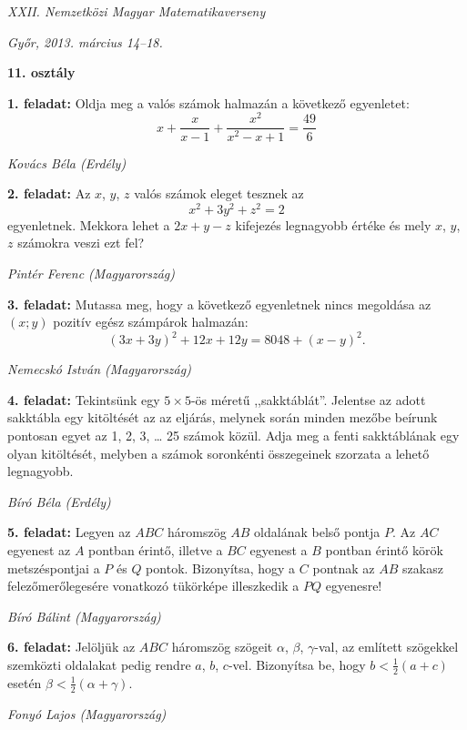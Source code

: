 \documentclass[a4paper,10pt]{article}
\newcommand{\ki}[2]{\hfill {\it #1 (#2)}\medskip}
\begin{document}
\begin{center} \Large {\em XXII. Nemzetközi Magyar Matematikaverseny} \end{center}
\begin{center} \large{\em Győr, 2013. március 14--18.} \end{center}
\smallskip
\begin{center} \large{\bf 11. osztály} \end{center}
\bigskip 

{\bf 1. feladat: } Oldja meg a valós számok halmazán a következő egyenletet:
\[x+\frac{x}{x-1}+\frac{x^2}{x^2-x+1}=\frac{49}{6}\]

\ki{Kovács Béla}{Erdély}\medskip

{\bf 2. feladat: } Az $x$, $y$, $z$ valós számok eleget tesznek az
\[x^2+3y^2+z^2=2\]
egyenletnek. Mekkora lehet a $2x+y-z$ kifejezés legnagyobb értéke és mely $x$, $y$, $z$
számokra veszi ezt fel?

\ki{Pintér Ferenc}{Magyarország}\medskip

{\bf 3. feladat: } Mutassa meg, hogy a következő egyenletnek nincs megoldása az $(x; y)$ pozitív egész számpárok halmazán:
\[(3x+3y)^2+12x+12y=8048+(x-y)^2.\]

\ki{Nemecskó István}{Magyarország}\medskip

{\bf 4. feladat: } Tekintsünk egy $5\times5$-ös méretű ,,sakktáblát''. Jelentse az adott sakktábla egy kitöltését az az eljárás, melynek során minden mezőbe beírunk pontosan egyet az 1, 2, 3, \ldots{} 25 számok közül. Adja meg a fenti sakktáblának egy olyan kitöltését, melyben a számok soronkénti összegeinek szorzata a lehető legnagyobb.

\ki{Bíró Béla}{Erdély}\medskip

{\bf 5. feladat: } Legyen az $ABC$ háromszög $AB$ oldalának belső pontja $P$. Az $AC$ egyenest az $A$ pontban érintő, illetve a $BC$ egyenest a $B$ pontban érintő körök metszéspontjai a $P$ és $Q$ pontok. Bizonyítsa, hogy a $C$ pontnak az $AB$ szakasz felezőmerőlegesére vonatkozó tükörképe illeszkedik a $PQ$ egyenesre!

\ki{Bíró Bálint}{Magyarország}\medskip

{\bf 6. feladat: } Jelöljük az $ABC$ háromszög szögeit $\alpha$, $\beta$, $\gamma$-val, az említett szögekkel szemközti oldalakat pedig rendre $a$, $b$, $c$-vel. Bizonyítsa be, hogy $b<\frac{1}{2}(a+c)$ esetén $\beta<\frac{1}{2}(\alpha+\gamma)$.

\ki{Fonyó Lajos}{Magyarország}
\end{document}
